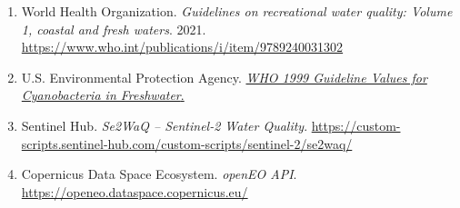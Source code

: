 \documentclass[11pt,letterpaper]{article}
\begin{document}
\begin{enumerate}
\item World Health Organization. \emph{Guidelines on recreational water quality: Volume 1, coastal and fresh waters}. 2021. \url{https://www.who.int/publications/i/item/9789240031302}
\item U.S. Environmental Protection Agency. \href{https://www.epa.gov/habs/world-health-organization-who-1999-guideline-values-cyanobacteria-freshwater}{\emph{WHO 1999 Guideline Values for Cyanobacteria in Freshwater}.}
\item Sentinel Hub. \emph{Se2WaQ -- Sentinel-2 Water Quality}. \url{https://custom-scripts.sentinel-hub.com/custom-scripts/sentinel-2/se2waq/}
\item Copernicus Data Space Ecosystem. \emph{openEO API}. \url{https://openeo.dataspace.copernicus.eu/}
\end{enumerate}
\end{document}
